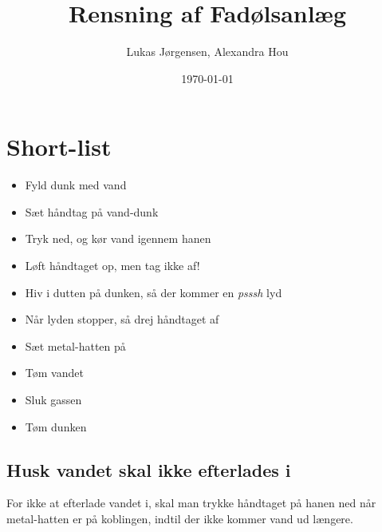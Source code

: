 

\title{Rensning af Fadølsanlæg}
\date{\today}
\author{Lukas Jørgensen, Alexandra Hou}



\maketitle

\section{Short-list}

\begin{itemize}
  \item Fyld dunk med vand
  \item Sæt håndtag på vand-dunk
  \item Tryk ned, og kør vand igennem hanen
  \item Løft håndtaget op, men tag ikke af!
  \item Hiv i dutten på dunken, så der kommer en \textit{psssh} lyd
  \item Når lyden stopper, så drej håndtaget af
  \item Sæt metal-hatten på
  \item Tøm vandet
  \item Sluk gassen
  \item Tøm dunken
\end{itemize}

\subsection{Husk vandet skal ikke efterlades i}
For ikke at efterlade vandet i, skal man trykke håndtaget på
hanen ned når metal-hatten er på koblingen, indtil der ikke kommer
vand ud længere.

